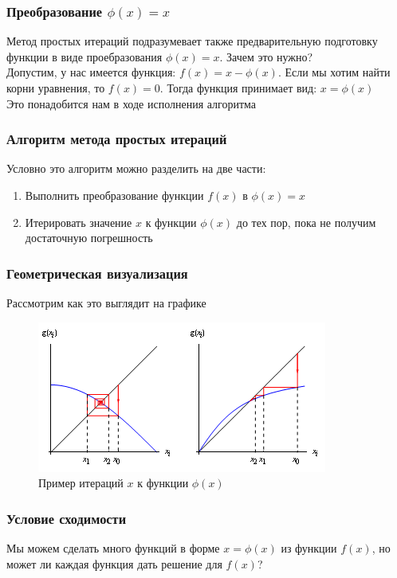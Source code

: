 \documentclass[11pt, english]{article}
\begin{document}
\subsubsection{Преобразование $\phi(x) = x$}
Метод простых итераций подразумевает также предварительную подготовку функции в виде проебразования $\phi(x) = x$. Зачем это нужно?
\\

Допустим, у нас имеется функция: $f(x) = x - \phi(x)$. Если мы хотим найти корни уравнения, то $f(x) = 0$. Тогда функция принимает вид: $x = \phi(x)$
\\

Это понадобится нам в ходе исполнения алгоритма

\subsubsection{Алгоритм метода простых итераций}
Условно это алгоритм можно разделить на две части: 
\begin{enumerate}
    \item Выполнить преобразование функции $f(x)$ в $\phi(x) = x$
    \item Итерировать значение $x$ к функции $\phi(x)$ до тех пор, пока не получим достаточную погрешность
\end{enumerate}
\subsubsection{Геометрическая визуализация}
Рассмотрим как это выглядит на графике
\begin{figure}[h!]
    \centering
    \includegraphics{fixed_point_iteration_im2.png}
    \caption{Пример итераций $x$ к функции $\phi(x)$}
    \label{fig:my_label}
\end{figure}

\subsubsection{Условие сходимости}
Мы можем сделать много функций в форме $x = \phi(x)$ из функции $f(x)$, но может ли каждая функция дать решение для $f(x)$?
\end{document}
